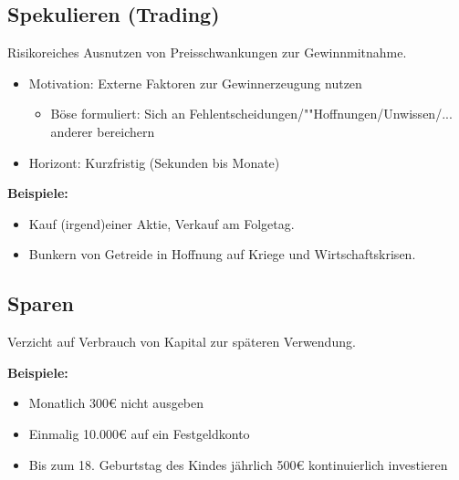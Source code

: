 \documentclass{beamer}
\begin{document}
		\subsection{Spekulieren (Trading)}
		
			\begin{frame}
				\begin{definition}
					Risikoreiches Ausnutzen von Preisschwankungen zur Gewinnmitnahme.
				\end{definition}
				\begin{itemize}
					\item Motivation: Externe Faktoren zur Gewinnerzeugung nutzen
					\begin{itemize}
						\item Böse formuliert: Sich an Fehlentscheidungen/""Hoffnungen/Unwissen/... anderer bereichern
					\end{itemize}
					\item Horizont: Kurzfristig (Sekunden bis Monate)
				\end{itemize}\n
				\textbf{Beispiele:}
				\begin{itemize}
					\item Kauf (irgend)einer Aktie, Verkauf am Folgetag.
					\item Bunkern von Getreide in Hoffnung auf Kriege und Wirtschaftskrisen.
				\end{itemize}
			\end{frame}
		
		\subsection{Sparen}
		
			\begin{frame}
				\begin{definition}
					Verzicht auf Verbrauch von Kapital zur späteren Verwendung.\citewiki{Sparen}
				\end{definition}\hfill
				
				\textbf{Beispiele:}
				\begin{itemize}
					\item Monatlich 300€ nicht ausgeben
					\item Einmalig 10.000€ auf ein Festgeldkonto
					\item Bis zum 18. Geburtstag des Kindes jährlich 500€ kontinuierlich investieren
				\end{itemize}
			\end{frame}
		
\end{document}
